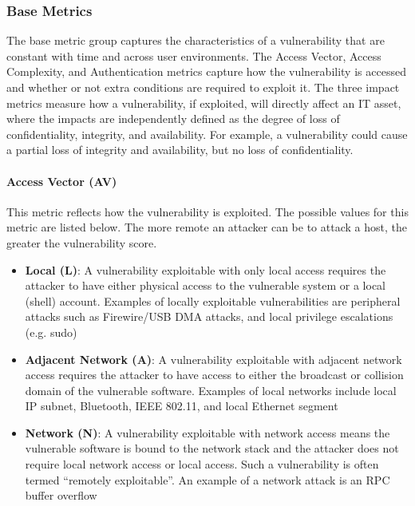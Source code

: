       \subsubsection{Base Metrics}\label{subsubsec:base-metrics}

        The base metric group captures the characteristics of a vulnerability
        that are constant with time and across user environments. The Access
        Vector, Access Complexity, and Authentication metrics capture how the
        vulnerability is accessed and whether or not extra conditions are
        required to exploit it. The three impact metrics measure how a
        vulnerability, if exploited, will directly affect an IT asset, where the
        impacts are independently defined as the degree of loss of
        confidentiality, integrity, and availability. For example, a
        vulnerability could cause a partial loss of integrity and availability,
        but no loss of confidentiality.

        \paragraph{Access Vector (AV)}\label{par:access-vector-av}

          This metric reflects how the vulnerability is exploited. The possible
          values for this metric are listed below. The more remote an
          attacker can be to attack a host, the greater the vulnerability score.

          \begin{itemize}
            \item
              \textbf{Local (L)}: A vulnerability exploitable with only local
              access requires the attacker to have either physical access to the
              vulnerable system or a local (shell) account. Examples of locally
              exploitable vulnerabilities are peripheral attacks such as
              Firewire/USB DMA attacks, and local privilege escalations
              (e.g. sudo)
            \item
              \textbf{Adjacent Network (A)}: A vulnerability exploitable with
              adjacent network access requires the attacker to have access to
              either the broadcast or collision domain of the vulnerable
              software. Examples of local networks include local IP subnet,
              Bluetooth, IEEE 802.11, and local Ethernet segment
            \item
              \textbf{Network (N)}: A vulnerability exploitable with network
              access means the vulnerable software is bound to the network stack
              and the attacker does not require local network access or local
              access. Such a vulnerability is often termed ``remotely
              exploitable''. An example of a network attack is an RPC buffer
              overflow
          \end{itemize}

